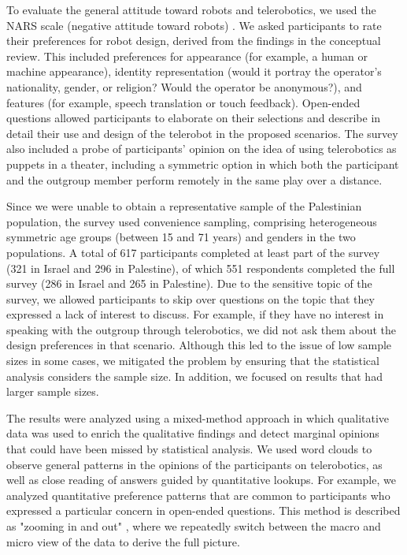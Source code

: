 \documentclass[dissertation,math,vertlayout,pdfa,colorlinks]{aaltoseries}
\begin{document}
To evaluate the general attitude toward robots and telerobotics, we used the NARS scale (negative attitude toward robots) \cite{syrdalNegativeAttitudesRobots2009, tsuiUsingNegativeAttitude2010}. We asked participants to rate their preferences for robot design, derived from the findings in the conceptual review. This included preferences for appearance (for example, a human or machine appearance), identity representation (would it portray the operator's nationality, gender, or religion? Would the operator be anonymous?), and features (for example, speech translation or touch feedback). Open-ended questions allowed participants to elaborate on their selections and describe in detail their use and design of the telerobot in the proposed scenarios. The survey also included a probe of participants' opinion on the idea of using telerobotics as puppets in a theater, including a symmetric option in which both the participant and the outgroup member perform remotely in the same play over a distance.

Since we were unable to obtain a representative sample of the Palestinian population, the survey used convenience sampling, comprising heterogeneous symmetric age groups (between 15 and 71 years) and genders in the two populations. A total of 617 participants completed at least part of the survey (321 in Israel and 296 in Palestine), of which 551 respondents completed the full survey (286 in Israel and 265 in Palestine). Due to the sensitive topic of the survey, we allowed participants to skip over questions on the topic that they expressed a lack of interest to discuss. For example, if they have no interest in speaking with the outgroup through telerobotics, we did not ask them about the design preferences in that scenario. Although this led to the issue of low sample sizes in some cases, we mitigated the problem by ensuring that the statistical analysis considers the sample size. In addition, we focused on results that had larger sample sizes.

The results were analyzed using a mixed-method approach \cite{creswellMixedmethodResearchIntroduction1999} in which qualitative data was used to enrich the qualitative findings and detect marginal opinions that could have been missed by statistical analysis. We used word clouds to observe general patterns in the opinions of the participants on telerobotics, as well as close reading of answers guided by quantitative lookups. For example, we analyzed quantitative preference patterns that are common to participants who expressed a particular concern in open-ended questions. This method is described as "zooming in and out" \cite{busch-jensenZoomingZoomingOut2019, nicoliniZoomingOutStudying2009}, where we repeatedly switch between the macro and micro view of the data to derive the full picture.
\end{document}
